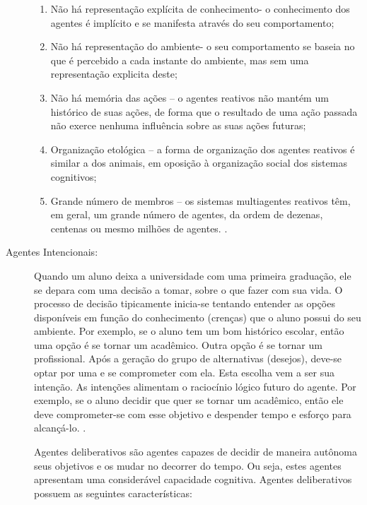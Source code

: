 \begin{description}
\begin{citacao}
\begin{enumerate}
	\item Não há representação explícita de conhecimento- o conhecimento dos agentes é implícito e se manifesta através do seu comportamento;

	\item Não há representação do ambiente- o seu comportamento se baseia no que é percebido a cada instante do ambiente, mas sem uma representação explicita deste; 

	\item Não há memória das ações – o agentes reativos não mantém um histórico de suas ações, de forma que o resultado de uma ação passada não exerce nenhuma influência sobre as suas ações futuras;


	\item Organização etológica – a forma de organização dos agentes reativos é similar a dos animais, em oposição à organização social dos sistemas cognitivos;

 	\item Grande número de membros – os sistemas multiagentes reativos têm, em geral, um grande número de agentes, da ordem de dezenas, centenas ou mesmo milhões de agentes.
 	\newline \cite[p. 12]{alvares1997}.

\end{enumerate}
\end{citacao}


\item [Agentes Intencionais:]

Quando um aluno deixa a universidade com uma primeira graduação, ele se depara com uma decisão a tomar, sobre o que fazer com sua vida. O processo de decisão tipicamente inicia-se tentando entender as opções disponíveis em função do conhecimento (crenças) que o aluno possui do seu ambiente. Por exemplo, se o aluno tem um bom histórico escolar, então uma opção é se tornar um acadêmico. Outra opção é se tornar um profissional. Após a geração do grupo de alternativas (desejos), deve-se optar por uma e se comprometer com ela. Esta escolha vem a ser sua intenção. As intenções alimentam o raciocínio lógico futuro do agente. Por exemplo, se o aluno decidir que quer se tornar um acadêmico, então ele deve comprometer-se com esse objetivo e despender tempo e esforço para alcançá-lo. .

Agentes deliberativos são agentes capazes de decidir de maneira autônoma seus objetivos e os mudar no decorrer do tempo. Ou seja, estes agentes apresentam uma considerável capacidade cognitiva. Agentes deliberativos possuem as seguintes características:
\begin{citacao}
\begin{enumerate}


\end{enumerate}
\end{citacao}
\end{description}
